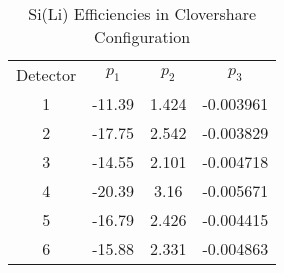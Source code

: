 \begin{table}[]
    \centering
    \caption{Si(Li) Efficiencies in Clovershare Configuration}
    \begin{tabular}{c|c|c|c}
    \toprule
        Detector & $p_1$ & $p_2$ & $p_3$ \\
        1	&	-11.39	&	1.424	&	-0.003961	\\
        2	&	-17.75	&	2.542	&	-0.003829	\\
        3	&	-14.55	&	2.101	&	-0.004718	\\
        4	&	-20.39	&	3.16	&	-0.005671	\\
        5	&	-16.79	&	2.426	&	-0.004415	\\
        6	&	-15.88	&	2.331	&	-0.004863	\\
    \end{tabular}
    \label{tab:sili_eff_clover}
\end{table}